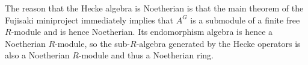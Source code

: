 The reason that the Hecke algebra is Noetherian is that the main theorem of the Fujisaki
miniproject immediately implies that $A^G$ is a submodule of a finite free $R$-module
and is hence Noetherian. Its endomorphism algebra is hence a Noetherian $R$-module,
so the sub-$R$-algebra generated by the Hecke operators is also a Noetherian $R$-module
and thus a Noetherian ring.
